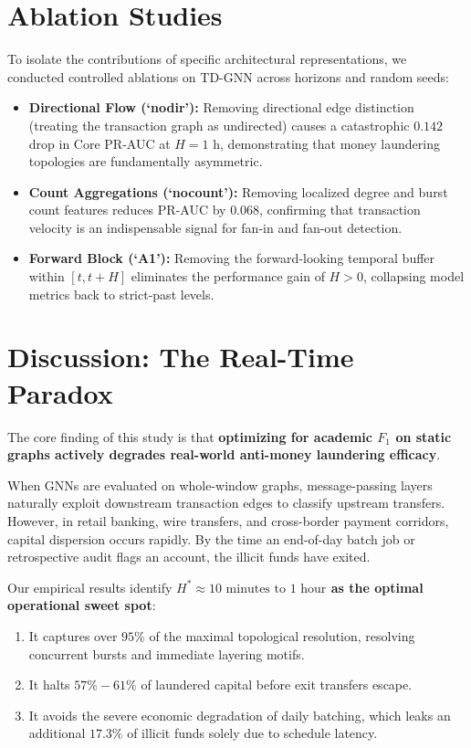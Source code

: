 \documentclass[10pt,twocolumn,letterpaper]{article}
\begin{document}
\section{Ablation Studies}
\label{sec:ablations}

To isolate the contributions of specific architectural representations, we conducted controlled ablations on TD-GNN across horizons and random seeds:
\begin{itemize}[leftmargin=*]
    \item \textbf{Directional Flow (`nodir'):} Removing directional edge distinction (treating the transaction graph as undirected) causes a catastrophic $0.142$ drop in Core PR-AUC at $H=1\text{ h}$, demonstrating that money laundering topologies are fundamentally asymmetric.
    \item \textbf{Count Aggregations (`nocount'):} Removing localized degree and burst count features reduces PR-AUC by $0.068$, confirming that transaction velocity is an indispensable signal for fan-in and fan-out detection.
    \item \textbf{Forward Block (`A1'):} Removing the forward-looking temporal buffer within $[t, t+H]$ eliminates the performance gain of $H>0$, collapsing model metrics back to strict-past levels.
\end{itemize}

\section{Discussion: The Real-Time Paradox}
\label{sec:discussion}

The core finding of this study is that \textbf{optimizing for academic $F_1$ on static graphs actively degrades real-world anti-money laundering efficacy}. 

When GNNs are evaluated on whole-window graphs, message-passing layers naturally exploit downstream transaction edges to classify upstream transfers. However, in retail banking, wire transfers, and cross-border payment corridors, capital dispersion occurs rapidly. By the time an end-of-day batch job or retrospective audit flags an account, the illicit funds have exited. 

Our empirical results identify \textbf{$H^* \approx 10\text{ minutes to } 1\text{ hour}$ as the optimal operational sweet spot}:
\begin{enumerate}[leftmargin=*]
    \item It captures over $95\%$ of the maximal topological resolution, resolving concurrent bursts and immediate layering motifs.
    \item It halts $57\%-61\%$ of laundered capital before exit transfers escape.
    \item It avoids the severe economic degradation of daily batching, which leaks an additional $17.3\%$ of illicit funds solely due to schedule latency.
\end{enumerate}
\end{document}
